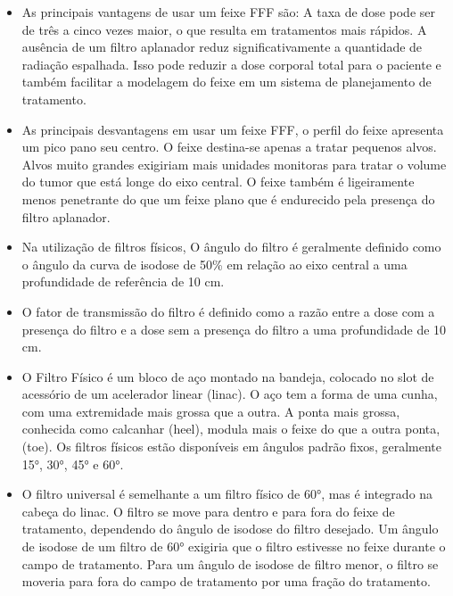 \documentclass[11pt,a4paper]{article}
\newcounter{exemplo}
\begin{document}
\begin{exemplo}
\begin{itemize}
		\item As principais vantagens de usar um feixe FFF são: A taxa de dose pode ser de três a cinco vezes maior, o que resulta em tratamentos mais rápidos. A ausência de um filtro aplanador reduz significativamente a quantidade de radiação espalhada. Isso pode reduzir a dose corporal total para o paciente e também facilitar a modelagem do feixe em um sistema de planejamento de tratamento.
		
		\item As principais desvantagens em usar um feixe FFF, o perfil do feixe apresenta um pico pano seu centro. O feixe destina-se apenas a tratar pequenos alvos. Alvos muito grandes exigiriam mais unidades monitoras para tratar o volume do tumor que está longe do eixo central. O feixe também é ligeiramente menos penetrante do que um feixe plano que é endurecido pela presença do filtro aplanador.
		
		\item Na utilização de filtros físicos, O ângulo do filtro é geralmente definido como o ângulo da curva de isodose de 50\% em relação ao eixo central a uma profundidade de referência de 10 cm.
		
		\item O fator de transmissão do filtro é definido como a razão entre a dose com a presença do filtro e a dose sem a presença do filtro a uma profundidade de 10 cm.
		
		\item O Filtro Físico é um bloco de aço montado na bandeja, colocado no slot de acessório de um acelerador linear (linac). O aço tem a forma de uma cunha, com uma extremidade mais grossa que a outra. A ponta mais grossa, conhecida como calcanhar (heel), modula mais o feixe do que a outra ponta, (toe). Os filtros físicos estão disponíveis em ângulos padrão fixos, geralmente 15°, 30°, 45° e 60°.
		
		\item O filtro universal é semelhante a um filtro físico de 60°, mas é integrado na cabeça do linac. O filtro se move para dentro e para fora do feixe de tratamento, dependendo do ângulo de isodose do filtro desejado. Um ângulo de isodose de um filtro de 60° exigiria que o filtro estivesse no feixe durante o campo de tratamento. Para um ângulo de isodose de filtro menor, o filtro se moveria para fora do campo de tratamento por uma fração do tratamento.
		

\end{itemize}
\end{exemplo}
\end{document}
